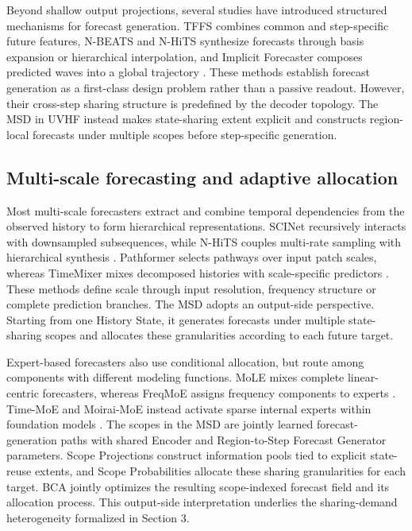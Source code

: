 \documentclass[final,3p,times]{elsarticle}
\newif\ifshowrevisions
\newcommand{\rev}[1]{\ifshowrevisions\textcolor{revisionblue}{#1}\else#1\fi}
\begin{document}
Beyond shallow output projections, several studies have introduced structured mechanisms for forecast generation. TFFS combines common and step-specific future features, N-BEATS and N-HiTS synthesize forecasts through basis expansion or hierarchical interpolation, and Implicit Forecaster composes predicted waves into a global trajectory \citep{zhang2024tffs,oreshkin2020nbeats,challu2023nhits,li2025implicit}. These methods establish forecast generation as a first-class design problem rather than a passive readout. However, their cross-step sharing structure is predefined by the decoder topology. \rev{The MSD in UVHF instead makes state-sharing extent explicit and constructs region-local forecasts under multiple scopes before step-specific generation.}

\subsection{Multi-scale forecasting and adaptive allocation}


Most multi-scale forecasters extract and combine temporal dependencies from the observed history to form hierarchical representations. SCINet recursively interacts with downsampled subsequences, while N-HiTS couples multi-rate sampling with hierarchical synthesis \citep{liu2022scinet,challu2023nhits}. Pathformer selects pathways over input patch scales, whereas TimeMixer mixes decomposed histories with scale-specific predictors \citep{chen2024pathformer,wang2024timemixer}. These methods define scale through input resolution, frequency structure or complete prediction branches. \rev{The MSD adopts an output-side perspective. Starting from one History State, it generates forecasts under multiple state-sharing scopes and allocates these granularities according to each future target.}

Expert-based forecasters also use conditional allocation, but route among components with different modeling functions. MoLE mixes complete linear-centric forecasters, whereas FreqMoE assigns frequency components to experts \citep{ni2024mole,liu2025freqmoe}. Time-MoE and Moirai-MoE instead activate sparse internal experts within foundation models \citep{shi2025timemoe,liu2025moiraimoe}. \rev{The scopes in the MSD are jointly learned forecast-generation paths with shared Encoder and Region-to-Step Forecast Generator parameters. Scope Projections construct information pools tied to explicit state-reuse extents, and Scope Probabilities allocate these sharing granularities for each target. BCA jointly optimizes the resulting scope-indexed forecast field and its allocation process.} This output-side interpretation underlies the sharing-demand heterogeneity formalized in Section 3.
\end{document}
